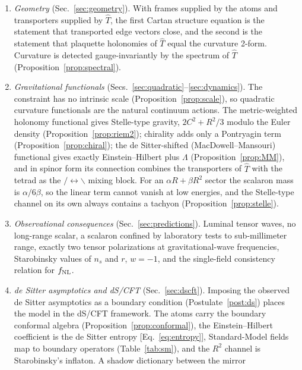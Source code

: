 \documentclass[reprint,aps,prd,amsmath,amssymb,superscriptaddress,nofootinbib,floatfix]{revtex4-2}
\theoremstyle{plain}
\theoremstyle{definition}
\theoremstyle{remark}
\newcommand{\Lat}{\ensuremath{/}}                 %
\newcommand{\Rat}{\ensuremath{\backslash}}        %
\newcommand{\Tc}{\hat{T}}
\newcommand{\Vc}{\hat{V}}
\begin{document}
\begin{enumerate}
field equation, the balance $\Tc=-\Vc$ at the level of the condensate (Proposition~\ref{prop:fieldeq}). In a curved
region its site-local part is forced to be the timelike normal of the spatial slice, so null directions live on the
bonds (Corollary~\ref{cor:sitelocal}).
\item \emph{Geometry} (Sec.~\ref{sec:geometry}). With frames supplied by the atoms and transporters
supplied by $\Tc$, the first Cartan structure equation is the statement that transported edge vectors
close, and the second is the statement that plaquette holonomies of $\Tc$ equal the curvature 2-form.
Curvature is detected gauge-invariantly by the spectrum of $\Tc$ (Proposition~\ref{prop:spectral}).
\item \emph{Gravitational functionals} (Secs.~\ref{sec:quadratic}--\ref{sec:dynamics}). The constraint has
no intrinsic scale (Proposition~\ref{prop:scale}), so quadratic curvature functionals are the natural
continuum actions. The metric-weighted holonomy functional gives Stelle-type gravity,
$2C^2+R^2/3$ modulo the Euler density (Proposition~\ref{prop:riem2}); chirality adds only a Pontryagin term
(Proposition~\ref{prop:chiral}); the de Sitter-shifted (MacDowell--Mansouri) functional gives exactly
Einstein--Hilbert plus $\Lambda$ (Proposition~\ref{prop:MM}), and in spinor form its connection combines the
transporters of $\Tc$ with the tetrad as the $\Lat\leftrightarrow\Rat$ mixing block. For an $\alpha R+\beta R^2$ sector the
scalaron mass is $\alpha/6\beta$, so the linear term cannot vanish at low energies, and the Stelle-type channel
on its own always contains a tachyon (Proposition~\ref{prop:stelle}).
\item \emph{Observational consequences} (Sec.~\ref{sec:predictions}). Luminal tensor waves, no long-range
scalar, a scalaron confined by laboratory tests to sub-millimeter range, exactly two tensor
polarizations at gravitational-wave frequencies, Starobinsky values of $n_s$ and $r$, $w=-1$, and the
single-field consistency relation for $f_{\rm NL}$.
\item \emph{de Sitter asymptotics and dS/CFT} (Sec.~\ref{sec:dscft}). Imposing the observed de Sitter
asymptotics as a boundary condition (Postulate~\ref{post:ds}) places the model in the dS/CFT framework. The
atoms carry the boundary conformal algebra (Proposition~\ref{prop:conformal}), the Einstein--Hilbert coefficient
is the de Sitter entropy [Eq.~\eqref{eq:entropy}], Standard-Model fields map to boundary operators
(Table~\ref{tab:sm}), and the $R^2$ channel is Starobinsky's inflaton. A shadow dictionary between the mirror

\end{enumerate}
\end{document}
